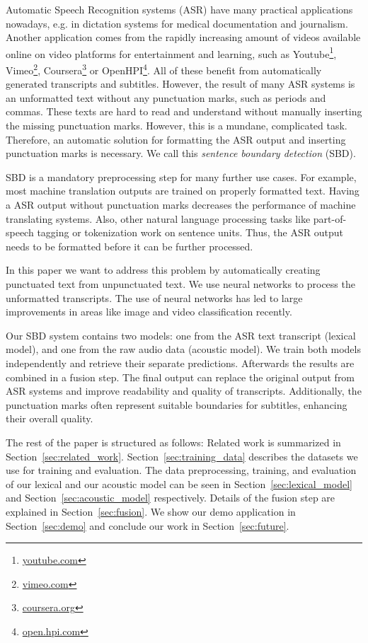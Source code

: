 Automatic Speech Recognition systems (ASR) have many practical applications nowadays, e.g. in dictation systems for medical documentation and journalism.
Another application comes from the rapidly increasing amount of videos available online on video platforms for entertainment and learning, such as Youtube\footnote{\url{youtube.com}}, Vimeo\footnote{\url{vimeo.com}}, Coursera\footnote{\url{coursera.org}} or OpenHPI\footnote{\url{open.hpi.com}}.
All of these benefit from automatically generated transcripts and subtitles.
However, the result of many ASR systems is an unformatted text without any punctuation marks, such as periods and commas.
These texts are hard to read and understand without manually inserting the missing punctuation marks.
However, this is a mundane, complicated task.
Therefore, an automatic solution for formatting the ASR output and inserting punctuation marks is necessary.
We call this \emph{sentence boundary detection} (SBD).

SBD is a mandatory preprocessing step for many further use cases.
For example, most machine translation outputs are trained on properly formatted text.
Having a ASR output without punctuation marks decreases the performance of machine translating systems.
Also, other natural language processing tasks like part-of-speech tagging or tokenization work on sentence units.
Thus, the ASR output needs to be formatted before it can be further processed.

In this paper we want to address this problem by automatically creating punctuated text from unpunctuated text.
We use neural networks to process the unformatted transcripts.
The use of neural networks has led to large improvements in areas like image and video classification recently. %

Our SBD system contains two models: one from the ASR text transcript (lexical model), and one from the raw audio data (acoustic model).
We train both models independently and retrieve their separate predictions.
Afterwards the results are combined in a fusion step.
The final output can replace the original output from ASR systems and improve readability and quality of transcripts.
Additionally, the punctuation marks often represent suitable boundaries for subtitles, enhancing their overall quality.

The rest of the paper is structured as follows:
Related work is summarized in Section~\ref{sec:related_work}.
Section~\ref{sec:training_data} describes the datasets we use for training and evaluation.
The data preprocessing, training, and evaluation of our lexical and our acoustic model can be seen in Section~\ref{sec:lexical_model} and Section~\ref{sec:acoustic_model} respectively.
Details of the fusion step are explained in Section~\ref{sec:fusion}.
We show our demo application in Section~\ref{sec:demo} and conclude our work in Section~\ref{sec:future}.
